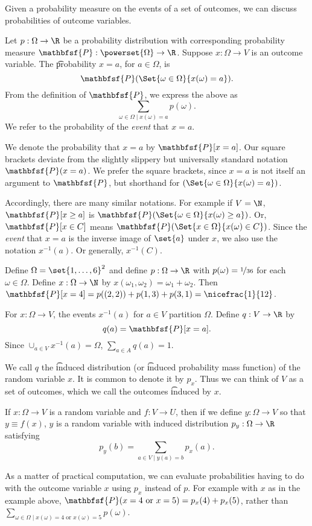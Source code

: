 
Given a probability measure on the events of a set of outcomes, we can discuss probabilities of outcome variables.

Let $p: \Omega  \to \R $ be a probability distribution with corresponding probability measure $\mathbfsf{P} : \powerset{\Omega } \to \R $.
Suppose $x: \Omega  \to V$ is an outcome variable.
The \t{probability $x = a$}, for $a \in \Omega $, is
  \[
\textstyle
\mathbfsf{P} (\Set{\omega  \in \Omega }{x(\omega ) = a}).
  \]
From the definition of $\mathbfsf{P} $, we express the above as
  \[
\textstyle
\sum_{\omega  \in \Omega  \mid x(\omega ) = a} p(\omega ).
  \]
We refer to the probability of the \textit{event} that $x = a$.

We denote the probability that $x = a$ by $\mathbfsf{P} [x =a]$.
Our square brackets deviate from the slightly slippery but universally standard notation $\mathbfsf{P} (x = a)$.
We prefer the square brackets, since $x=a$ is not itself an argument to $\mathbfsf{P} $, but shorthand for $(\Set{\omega  \in \Omega }{x(\omega ) = a})$.

Accordingly, there are many similar notations.
For example if $V = \N $, $\mathbfsf{P} [x \geq a]$ is $\mathbfsf{P} (\Set{\omega  \in \Omega }{x(\omega ) \geq a})$.
Or, $\mathbfsf{P} [x \in C]$ means $\mathbfsf{P} (\Set{x \in \Omega }{x(\omega ) \in C})$.
Since the \textit{event} that $x = a$ is the inverse image of $\set{a}$ under $x$, we also use the notation $x^{-1}(a)$.
Or generally, $x^{-1}(C)$.

Define $\Omega  = \set{1, \dots, 6}^2$ and define $p: \Omega \to \R $ with $p(\omega ) = \nicefrac{1}{36}$ for each $\omega \in \Omega $.
Define $x: \Omega  \to \N $ by $x(\omega _1, \omega _2) = \omega _1 + \omega _2$.
Then $\mathbfsf{P} [x = 4] = p((2, 2)) + p(1, 3) + p(3, 1) = \nicefrac{1}{12}$.

For $x: \Omega  \to V$, the events $x^{-1}(a)$ for $a \in V$ partition $\Omega $.
Define $q: V \to \R $ by
  \[
q(a) = \mathbfsf{P} [x = a].
  \]
Since $\cup_{a \in V} x^{-1}(a) = \Omega $, $\sum_{a \in A} q(a) = 1$.

We call $q$ the \t{induced distribution} (or \t{induced probability mass function}) of the random variable $x$.
It is common to denote it by $p_{x}$.
Thus we can think of $V$ as a set of outcomes, which we call the outcomes \t{induced} by $x$.

If $x: \Omega  \to V$ is a random variable and $f: V \to U$, then if we define $y: \Omega  \to V$ so that $y \equiv f(x)$, $y$ is a random variable with induced distribution $p_{y}: \Omega  \to \R $ satisfying
  \[
\textstyle
p_{y}(b) = \sum_{a \in V \mid y(a) = b} p_x(a).
  \]

As a matter of practical computation, we can evaluate probabilities having to do with the outcome variable $x$ using $p_x$ instead of $p$.
For example with $x$ as in the example above, $\mathbfsf{P} (x = 4 \text{ or } x = 5) = p_x(4) + p_x(5)$, rather than $\sum_{\omega  \in \Omega  \mid x(\omega ) = 4 \text{ or } x(\omega ) = 5} p(\omega )$.
